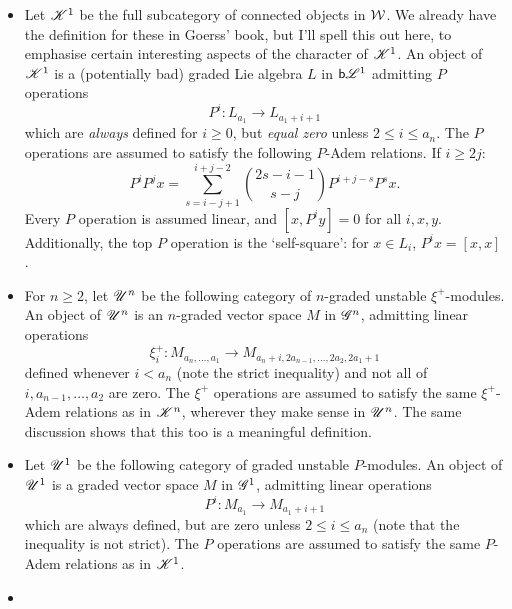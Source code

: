 \documentclass[11pt]{article}
\newcommand{\BadLie}[1]{\mathsf{b}{\scrL}^{#1}}%
\newcommand{\LL}[1]{{\scrK}^{#1}}%
\newcommand{\GR}[1]{\scrG^{#1}}%
\newcommand{\nontop}[1]{\scrU^{#1}}%
\newcommand{\LambdaOp}{\xi^{+}}
\begin{document}
\begin{itemize}
\item Let $\LL{1}$ be the full subcategory of connected objects in $\mathcal{W}$. We already have the definition for these in Goerss' book, but I'll spell this out here, to emphasise certain interesting aspects of the character of $\LL{1}$.
An object of $\LL{1}$ is a (potentially bad) graded Lie algebra $L$ in $\BadLie{1}$
admitting $P$ operations
\[P^i:L_{a_1}\to L_{a_1+i+1}\]
which are \emph{always} defined for $i\geq0$, but \emph{equal zero} unless $2\leq i\leq a_n$.
The $P$ operations are assumed to satisfy the following $P$-Adem relations. If $i\geq 2j$:
\[P^iP^jx=\sum_{s=i-j+1}^{i+j-2}{2s-i-1\choose s-j}P^{i+j-s}P^sx.\]
Every $P$ operation is assumed linear, and $[x,P^iy]=0$ for all $i,x,y$. Additionally, the top $P$ operation is the `self-square': for $x\in L_{i}$, $P^{i}x=[x,x]$.


\item For $n\geq2$, let $\nontop{n}$ be the following category of $n$-graded unstable $\LambdaOp$-modules. An object of $\nontop{n}$ is an $n$-graded vector space $M$ in $\GR{n}$,
admitting linear operations
\[\LambdaOp_i:M_{a_n,\ldots,a_1}\to M_{a_n+i,2a_{n-1},\ldots,2a_2,2a_1+1}\]
defined whenever $i< a_n$ (note the strict inequality) and not all of $i,a_{n-1},\ldots,a_{2}$ are zero.
The $\LambdaOp$ operations are assumed to satisfy the same $\LambdaOp$-Adem relations as in $\LL{n}$, wherever they make sense in $\nontop{n}$. The same discussion shows that this too is a meaningful definition. %

\item Let $\nontop{1}$ be the following category of graded unstable $P$-modules. An object of $\nontop{1}$ is a graded vector space $M$ in $\GR{1}$,
admitting linear operations
\[P^i:M_{a_1}\to M_{a_1+i+1}\]
which are always defined, but are zero unless $2\leq i\leq a_n$ (note that the inequality is not strict).
The $P$ operations are assumed to satisfy the same $P$-Adem relations as in $\LL{1}$. %

\item 


\end{itemize}
\end{document}
